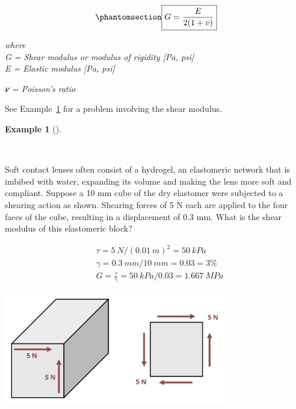 \documentclass[
  letterpaper,
  DIV=11,
  numbers=noendperiod]{scrreprt}
\theoremstyle{definition}
\newtheorem{example}{Example}[chapter]
\theoremstyle{remark}
\begin{document}
\begin{equation}\phantomsection\label{eq-4.4}{
\boxed{G=\frac{E}{2(1+v)}}
}\end{equation}

\emph{where}\\
\emph{G = Shear modulus or modulus of rigidity {[}Pa, psi{]}}\\
\emph{E = Elastic modulus {[}Pa, psi{]}}

\emph{𝜈 = Poisson's ratio}

See Example~\ref{exm-4.3} for a problem involving the shear modulus.

\begin{tcolorbox}[enhanced jigsaw, left=2mm, toptitle=1mm, breakable, coltitle=black, colbacktitle=quarto-callout-tip-color!10!white, opacitybacktitle=0.6, bottomrule=.15mm, titlerule=0mm, leftrule=.75mm, colframe=quarto-callout-tip-color-frame, bottomtitle=1mm, opacityback=0, title={Example 4.3}, arc=.35mm, colback=white, rightrule=.15mm, toprule=.15mm]

\begin{example}[]\protect\hypertarget{exm-4.3}{}\label{exm-4.3}

~

Soft contact lenses often consist of a hydrogel, an elastomeric network
that is imbibed with water, expanding its volume and making the lens
more soft and compliant. Suppose a 10 mm cube of the dry elastomer were
subjected to a shearing action as shown. Shearing forces of 5 N each are
applied to the four faces of the cube, resulting in a displacement of
0.3 mm. What is the shear modulus of this elastomeric block?

\begin{tcolorbox}[enhanced jigsaw, left=2mm, toptitle=1mm, breakable, coltitle=black, colbacktitle=quarto-callout-tip-color!10!white, opacitybacktitle=0.6, bottomrule=.15mm, titlerule=0mm, leftrule=.75mm, colframe=quarto-callout-tip-color-frame, bottomtitle=1mm, opacityback=0, title={Solution}, arc=.35mm, colback=white, rightrule=.15mm, toprule=.15mm]

\[
\begin{aligned}
& \tau=5{~N} /(0.01{~m})^2=50{~kPa} \\
& \gamma=0.3{~mm}/10{~mm}=0.03=3 \% \\
& G=\frac{\tau}{\gamma}=50{~kPa}/0.03=1.667{~MPa}
\end{aligned}
\]

\begin{center}
\includegraphics[width=3.79167in,height=\textheight]{images/CH4 PNGs/example 4.3.png}
\end{center}


\end{tcolorbox}
\end{example}
\end{tcolorbox}
\end{document}
